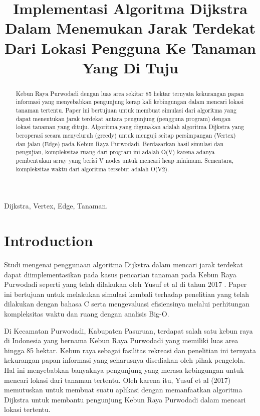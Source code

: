 \documentclass[conference]{IEEEtran}
\title{Implementasi Algoritma Dijkstra Dalam Menemukan Jarak Terdekat Dari Lokasi Pengguna Ke Tanaman Yang Di Tuju}
\author{\IEEEauthorblockN{Eunike Kristianti}
\IEEEauthorblockA{\textit{School of Electical Engineering and Informatics}\\
\textit{Institut Teknologi Bandung}\\
Bandung, Indonesia\\
Email: 18320019@std.stei.itb.ac.id}
}
\begin{document}
\maketitle

\begin{abstract}
Kebun Raya Purwodadi dengan luas area sekitar 85 hektar ternyata kekurangan papan informasi yang menyebabkan pengunjung kerap kali kebingungan dalam mencari lokasi tanaman tertentu. Paper ini bertujuan untuk membuat simulasi dari algoritma yang dapat menentukan jarak terdekat antara pengunjung (pengguna program) dengan lokasi tanaman yang dituju. Algoritma yang digunakan adalah algoritma Dijkstra yang beroperasi secara menyeluruh (greedy) untuk menguji seitap persimpangan (Vertex) dan jalan (Edge) pada Kebun Raya Purwodadi. Berdasarkan hasil simulasi dan pengujian, kompleksitas ruang dari program ini adalah O(V) karena adanya pembentukan array yang berisi V nodes untuk mencari heap minimum. Sementara, kompleksitas waktu dari algoritma tersebut adalah O(V2).
\end{abstract}

\begin{IEEEkeywords}
Dijkstra, Vertex, Edge, Tanaman.
\end{IEEEkeywords}

\section{Introduction}
Studi mengenai penggunaan algoritma Dijkstra dalam mencari jarak terdekat dapat diimplementasikan pada kasus pencarian tanaman pada Kebun Raya Purwodadi seperti yang telah dilakukan oleh Yusuf et al di tahun 2017 \cite{article1}. Paper ini bertujuan untuk melakukan simulasi kembali terhadap penelitian yang telah dilakukan dengan bahasa C serta mengevaluasi efisiensinya melalui perhitungan kompleksitas waktu dan ruang dengan analisis Big-O.

Di Kecamatan Purwodadi, Kabupaten Pasuruan, terdapat salah satu kebun raya di Indonesia yang bernama Kebun Raya Purwodadi yang memiliki luas area hingga 85 hektar. Kebun raya sebagai fasilitas rekreasi dan penelitian ini ternyata kekurangan papan informasi yang seharusnya disediakan oleh pihak pengelola. Hal ini menyebabkan banyaknya pengunjung yang merasa kebingungan untuk mencari lokasi dari tanaman tertentu. Oleh karena itu, Yusuf et al (2017) memutuskan untuk membuat suatu aplikasi dengan memanfaatkan algoritma Dijkstra untuk membantu pengunjung Kebun Raya Purwodadi dalam mencari lokasi tertentu.
\end{document}

